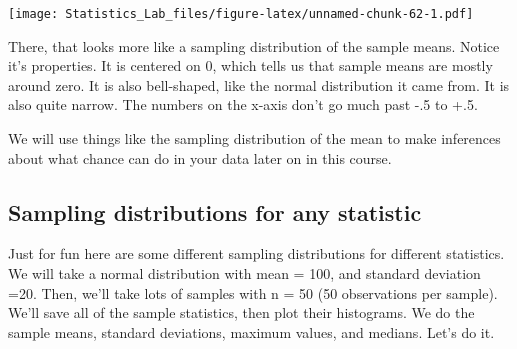 \documentclass[
]{book}
\begin{document}
\texttt{[image: Statistics\_Lab\_files/figure-latex/unnamed-chunk-62-1.pdf]}

There, that looks more like a sampling distribution of the sample means.
Notice it's properties. It is centered on 0, which tells us that sample
means are mostly around zero. It is also bell-shaped, like the normal
distribution it came from. It is also quite narrow. The numbers on the
x-axis don't go much past -.5 to +.5.

We will use things like the sampling distribution of the mean to make
inferences about what chance can do in your data later on in this
course.

\hypertarget{sampling-distributions-for-any-statistic}{%
\subsection{Sampling distributions for any statistic}\label{sampling-distributions-for-any-statistic}}

Just for fun here are some different sampling distributions for
different statistics. We will take a normal distribution with mean =
100, and standard deviation =20. Then, we'll take lots of samples with n
= 50 (50 observations per sample). We'll save all of the sample
statistics, then plot their histograms. We do the sample means, standard
deviations, maximum values, and medians. Let's do it.
\end{document}
